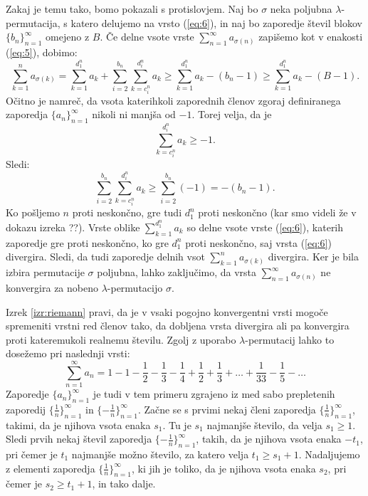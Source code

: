 \documentclass[12pt,a4paper,reqno]{amsart}
\theoremstyle{definition} %
\theoremstyle{plain} %
\begin{document}
Zakaj je temu tako, bomo pokazali s protislovjem. Naj bo $\sigma$ neka poljubna $\lambda$-permutacija, s katero delujemo na vrsto (\ref{eq:6}), in naj bo zaporedje števil blokov $\{b_n\}_{n=1}^{\infty}$ omejeno z $B$. Če delne vsote vrste $\sum_{n=1}^{\infty}a_{\sigma(n)}$ zapišemo kot v enakosti (\ref{eq:5}), dobimo:
$$\sum_{k=1}^{n}a_{\sigma(k)}=\sum_{k=1}^{d_1^n}a_{k} + \sum_{i=2}^{b_n}\sum_{k=c_i^n}^{d_i^n}a_{k} \geq \sum_{k=1}^{d_1^n}a_{k} - (b_n -1) \geq \sum_{k=1}^{d_1^n}a_{k} - (B -1).$$
Očitno je namreč, da vsota katerihkoli zaporednih členov zgoraj definiranega zaporedja $\{a_n\}_{n=1}^{\infty}$ nikoli ni manjša od $-1$. Torej velja, da je $$\sum_{k=c_i^n}^{d_i^n}a_{k} \geq -1.$$ Sledi:
$$\sum_{i=2}^{b_n}\sum_{k=c_i^n}^{d_i^n}a_{k} \geq \sum_{i=2}^{b_n}(-1) = -(b_n-1).$$
Ko pošljemo $n$ proti neskončno, gre tudi $d_1^n$ proti neskončno (kar smo videli že v dokazu izreka ??). Vrste oblike $\sum_{k=1}^{d_1^n}a_{k}$ so delne vsote vrste (\ref{eq:6}), katerih zaporedje gre proti neskončno, ko gre $d_1^n$ proti neskončno, saj vrsta (\ref{eq:6}) divergira. Sledi, da tudi zaporedje delnih vsot $\sum_{k=1}^{n}a_{\sigma(k)}$ divergira. Ker je bila izbira permutacije $\sigma$ poljubna, lahko zaključimo, da vrsta $\sum_{n=1}^{\infty}a_{\sigma(n)}$ ne konvergira za nobeno $\lambda$-permutacijo $\sigma$.


Izrek \ref{izr:riemann} pravi, da je v vsaki pogojno konvergentni vrsti mogoče spremeniti vrstni red členov tako, da dobljena vrsta divergira ali pa konvergira proti kateremukoli realnemu številu. Zgolj z uporabo $\lambda$-permutacij lahko to dosežemo pri naslednji vrsti:
\begin{equation}\label{eq:7}
\sum^{\infty}_{n=1}a_n= 1-1-\frac{1}{2}-\frac{1}{3}-\frac{1}{4}+\frac{1}{2}+\frac{1}{3}+\dots +\frac{1}{33}-\frac{1}{5}-\dots
\end{equation}
Zaporedje $\{a_n\}_{n=1}^{\infty}$ je tudi v tem primeru zgrajeno iz med sabo prepletenih zaporedij $\{\frac{1}{n}\}_{n=1}^{\infty}$ in $\{-\frac{1}{n}\}_{n=1}^{\infty}$. Začne se s prvimi nekaj členi zaporedja $\{\frac{1}{n}\}_{n=1}^{\infty}$, takimi, da je njihova vsota enaka $s_1$. Tu je $s_1$ najmanjše število, da velja $s_1 \geq 1$. Sledi prvih nekaj števil zaporedja $\{-\frac{1}{n}\}_{n=1}^{\infty}$, takih, da je njihova vsota enaka $-t_1$, pri čemer je $t_1$ najmanjše možno število, za katero velja $t_1 \geq s_1+1$. Nadaljujemo z elementi zaporedja $\{\frac{1}{n}\}_{n=1}^{\infty}$, ki jih je toliko, da je njihova vsota enaka $s_2$, pri čemer je $s_2\geq t_1+1$, in tako dalje. %
\end{document}

